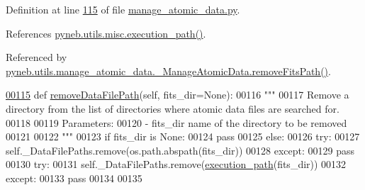 Definition at line \hyperlink{manage__atomic__data_8py_source_l00115}{115} of file \hyperlink{manage__atomic__data_8py_source}{manage\+\_\+atomic\+\_\+data.\+py}.



References \hyperlink{misc_8py_source_l00007}{pyneb.\+utils.\+misc.\+execution\+\_\+path()}.



Referenced by \hyperlink{manage__atomic__data_8py_source_l00031}{pyneb.\+utils.\+manage\+\_\+atomic\+\_\+data.\+\_\+\+Manage\+Atomic\+Data.\+remove\+Fits\+Path()}.


\begin{DoxyCode}
\hypertarget{classpyneb_1_1utils_1_1manage__atomic__data_1_1___manage_atomic_data_l00115}{}\hyperlink{classpyneb_1_1utils_1_1manage__atomic__data_1_1___manage_atomic_data_a058a05e4bc4bb113b7ec44510a1a40f8}{00115}     \textcolor{keyword}{def }\hyperlink{classpyneb_1_1utils_1_1manage__atomic__data_1_1___manage_atomic_data_a058a05e4bc4bb113b7ec44510a1a40f8}{removeDataFilePath}(self, fits\_dir=None):
00116         \textcolor{stringliteral}{"""}
00117 \textcolor{stringliteral}{        Remove a directory from the list of directories where atomic data files are searched for.}
00118 \textcolor{stringliteral}{}
00119 \textcolor{stringliteral}{        Parameters:}
00120 \textcolor{stringliteral}{           - fits\_dir    name of the directory to be removed}
00121 \textcolor{stringliteral}{}
00122 \textcolor{stringliteral}{        """}
00123         \textcolor{keywordflow}{if} fits\_dir \textcolor{keywordflow}{is} \textcolor{keywordtype}{None}:
00124             \textcolor{keywordflow}{pass}
00125         \textcolor{keywordflow}{else}:
00126             \textcolor{keywordflow}{try}:
00127                 self.\_DataFilePaths.remove(os.path.abspath(fits\_dir))
00128             \textcolor{keywordflow}{except}:
00129                 \textcolor{keywordflow}{pass}
00130             \textcolor{keywordflow}{try}:
00131                 self.\_DataFilePaths.remove(\hyperlink{namespacepyneb_1_1utils_1_1misc_a0e9572755930aabb03c6b0e5d66b8356}{execution\_path}(fits\_dir))
00132             \textcolor{keywordflow}{except}:
00133                 \textcolor{keywordflow}{pass}
00134  
00135                 
\end{DoxyCode}
\hypertarget{classpyneb_1_1utils_1_1manage__atomic__data_1_1___manage_atomic_data_a9cade6c2f74e46262270c8464c9811d7}{}
